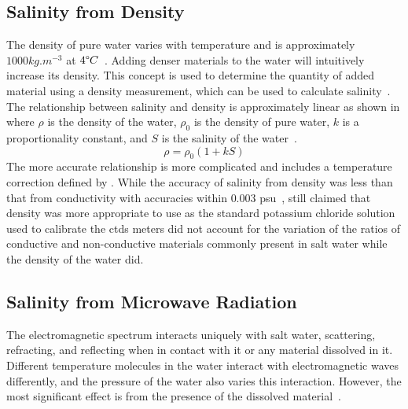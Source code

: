 \subsection{Salinity from Density}

The density of pure water varies with temperature and is approximately $1000 kg.m^{-3}$ at $4\degree C$~\cite{USGS_water_density_2018}.
Adding denser materials to the water will intuitively increase its density.
This concept is used to determine the quantity of added material using a density measurement, which can be used to calculate salinity~\cite{kjerfve_salinity_measurement_overview_1983}.
The relationship between salinity and density is approximately linear as shown in  where $\rho$ is the density of the water, $\rho_0$ is the density of pure water, $k$ is a proportionality constant, and $S$ is the salinity of the water~\cite{uow_oceanography_research_1966}.
\begin{equation}\label{eqn:salinity-density}
    \rho = \rho_0(1 + kS)
\end{equation}
The more accurate relationship is more complicated and includes a temperature correction defined by .
While the accuracy of salinity from density was less than that from conductivity with accuracies within $0.003$ \gls{psu}~\cite{millero_international_one_atmosphere_eos_seawater_1981},  still claimed that density was more appropriate to use as the standard potassium chloride solution used to calibrate the \glspl{ctd} meters did not account for the variation of the ratios of conductive and non-conductive materials commonly present in salt water while the density of the water did.

\subsection{Salinity from Microwave Radiation}

The electromagnetic spectrum interacts uniquely with salt water, scattering, refracting, and reflecting when in contact with it or any material dissolved in it.
Different temperature molecules in the water interact with electromagnetic waves differently, and the pressure of the water also varies this interaction. However, the most significant effect is from the presence of the dissolved material~\cite{swift_considerations_for_microwave_salinity_1983}.


